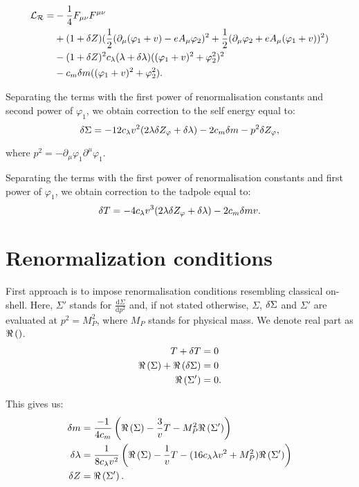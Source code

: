 \begin{align}
\mathcal{L_R} = &-\frac{1}{4}F_{\mu\nu}F^{\mu\nu} \\
&+(1+ \delta Z)(\frac{1}{2}(\partial_\mu(\varphi_1+v) - eA_\mu\varphi_2)^2
+\frac{1}{2}(\partial_\mu\varphi_2+eA_\mu(\varphi_1+v))^2) \notag \\
&-(1+\delta Z)^2c_\lambda(\lambda+\delta\lambda)((\varphi_1+v)^2+\varphi_2^2)^2  \notag \\
&-c_m\delta m((\varphi_1+v)^2+\varphi_2^2).
\end{align}





Separating the terms with the first power of renormalisation constants and second power of 
$\varphi_1$, we obtain correction to the self energy equal to:
\begin{equation}
\delta\Sigma=-12c_\lambda v^2(2\lambda\delta Z_\varphi+\delta\lambda)-2c_m\delta m-p^2\delta Z_\varphi,
\end{equation}

where $p^2 = -\partial_\mu \varphi_1\partial^\mu\varphi_1$.


Separating the terms with the first power of renormalisation constants and first power of 
$\varphi_1$, we obtain correction to the tadpole equal to:
\begin{equation}
\delta T=-4c_\lambda v^3(2\lambda\delta Z_\varphi+\delta\lambda)-2c_m\delta m v.
\end{equation}
\section{Renormalization conditions}
First approach is to impose renormalisation conditions resembling classical on-shell.
Here, $\Sigma'$ stands for $\frac{\textrm{d}\Sigma}{\textrm{d}p^2}$ and, if not 
stated otherwise, 
$\Sigma$, $\delta\Sigma$ and $\Sigma'$ are evaluated at $p^2 = M_P^2$, where 
$M_P$ stands for physical mass. We denote real part as $\Re\left(\right)$.
\begin{align}
T+\delta T &= 0 \\
\Re\left(\Sigma\right) + \Re\left(\delta\Sigma\right) &= 0 \\
\Re\left(\Sigma'\right) &= 0.
\end{align}

This gives us:
\begin{align}
\delta m &= \frac{-1}{4c_m}\left(\Re\left(\Sigma\right)-\frac{3}{v}T-M_P^2\Re\left(\Sigma'\right)
\right)\\
\delta\lambda &= \frac{1}{8c_\lambda v^2}\left(\Re\left(\Sigma\right)-\frac{1}{v}T-(16c_\lambda\lambda v^2+M_P^2)
\Re\left(\Sigma'\right)
\right)\\
\delta Z &= \Re\left(\Sigma'\right).
\end{align}

